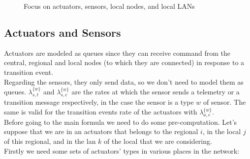 \documentclass[11pt]{article}
\begin{document}
\begin{figure}[H]
	\centering
	\frame{}
	\caption{Focus on actuators, sensors,  local nodes, and local LANs}
\end{figure}

\subsection{Actuators and Sensors}
Actuators are modeled as queues since they can receive command from the central, regional and local nodes (to which they are connected) in response to a transition event.\\
Regarding the sensors, they only send data, so we don't need to model them as queues. $\lambda^{\{w\}}_{s,t}$ and $\lambda^{\{w\}}_{s,e}$ are the rates at which the sensor sends a telemetry or a transition message respectively, in the case the sensor is a type $w$ of sensor. The same is valid for the transition events rate of the actuators with $\lambda^{\{w\}}_{a,e}$.\\


Before going to the main formula we need to do some pre-computation. 
Let's suppose that we are in an actuators that belongs to the regional $i$, in the local $j$ of this regional, and in the lan $k$ of the local that we are considering. \\
Firstly we need some sets of actuators' types in various places in the network:
\end{document}
